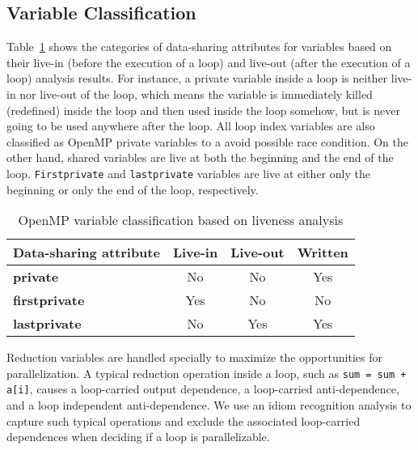 \subsection{Variable Classification}
Table~\ref{tab:varClassification} shows the categories of
data-sharing attributes for variables based on their live-in (before the
execution of a loop) and live-out (after the execution of a loop)
analysis results. For instance, a private variable inside a
loop is neither live-in nor live-out of the loop, which means the 
variable is immediately killed (redefined) inside the loop and then used inside
the loop somehow, but is never going to be used anywhere after the loop.
All loop index variables are also classified as OpenMP private variables to a avoid
possible race condition.
On the other hand, shared variables are live at both the beginning and the end of the loop.
\lstinline{Firstprivate} and \lstinline{lastprivate} variables are live at either only the beginning or
only the end of the loop, respectively.

\begin{table}[htbp]
\caption{OpenMP variable classification based on liveness analysis}
        \centering
\begin{tabular}{||l||c|c|c||} \hline
\textbf{Data-sharing attribute} & \textbf{Live-in} & \textbf{Live-out} &
\textbf{Written} \\ \hline
{\bfseries\scriptsize{private}} & No & No & Yes       \\ \hline
{\bfseries\scriptsize{firstprivate}} & Yes & No & No \\ \hline
{\bfseries\scriptsize{lastprivate}} & No & Yes  & Yes  \\ \hline
\end{tabular} 
\label{tab:varClassification}
\end{table}

Reduction variables are handled specially to maximize the opportunities for
parallelization.
A typical reduction operation inside a loop, such as
\lstinline{sum = sum + a[i]},
causes a loop-carried output
dependence, a loop-carried anti-dependence, and a loop independent anti-dependence.
We use an idiom recognition analysis to capture such typical operations and exclude
the associated loop-carried dependences when deciding if a loop is
parallelizable.
